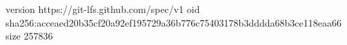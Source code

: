 version https://git-lfs.github.com/spec/v1
oid sha256:acceaed20b35cf20a92ef195729a36b776c75403178b3dddda68b3ce118eaa66
size 257836
